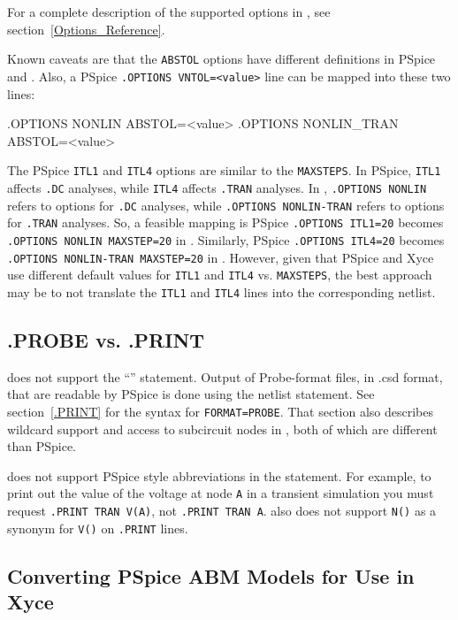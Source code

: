 
For a complete description of the supported options in \Xyce{}, see
section~\ref{Options_Reference}.  

Known caveats are that the \texttt{ABSTOL} options have different definitions 
in PSpice and \Xyce{}.  Also, a PSpice \texttt{.OPTIONS VNTOL=<value>} line can 
be mapped into these two \Xyce{} lines:
\begin{vquote}
.OPTIONS NONLIN ABSTOL=<value> 
.OPTIONS NONLIN_TRAN ABSTOL=<value>
\end{vquote}

The PSpice \texttt{ITL1} and \texttt{ITL4} options are similar to the \Xyce{} \texttt{MAXSTEPS}.
In PSpice, \texttt{ITL1} affects \texttt{.DC} analyses, while \texttt{ITL4} 
affects \texttt{.TRAN} analyses.  In \Xyce{}, \texttt{.OPTIONS NONLIN}
refers to options for \texttt{.DC} analyses, while \texttt{.OPTIONS NONLIN-TRAN}
refers to options for \texttt{.TRAN} analyses.  So, a feasible mapping is 
PSpice \texttt{.OPTIONS ITL1=20} becomes \texttt{.OPTIONS NONLIN MAXSTEP=20}
in \Xyce{}.  Similarly, PSpice \texttt{.OPTIONS ITL4=20} becomes 
\texttt{.OPTIONS NONLIN-TRAN MAXSTEP=20} in \Xyce{}.  However, given that
PSpice and Xyce{} use different default values for \texttt{ITL1} and \texttt{ITL4} 
vs. \texttt{MAXSTEPS}, the best approach may be to not translate the \texttt{ITL1} and 
\texttt{ITL4} lines into the corresponding \Xyce{} netlist.

\subsection{.PROBE vs. .PRINT}
\Xyce{} does not support the ``'' statement.  Output of Probe-format
files, in .csd format, that are readable by PSpice is done using the  netlist statement.
See section~\ref{.PRINT} for the syntax for \texttt{FORMAT=PROBE}.  That section
also describes wildcard support and access to subcircuit nodes in \Xyce{}, both of
which are different than PSpice.

\Xyce{} does not support PSpice style abbreviations in the 
statement.  For example, to print out the value of the voltage at node
\texttt{A} in a transient simulation you must request \mbox{\texttt{.PRINT TRAN V(A)}},
not \mbox{\texttt{.PRINT TRAN A}}.  \Xyce{} also does not support \texttt{N()} as a
synonym for \texttt{V()} on \texttt{.PRINT} lines.

\subsection{Converting PSpice ABM Models for Use in Xyce}
\label{Converting_ABM}

